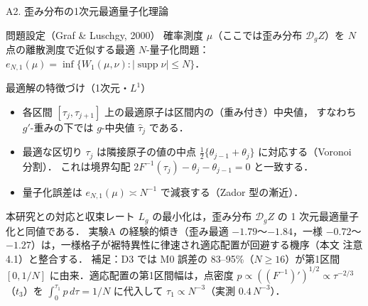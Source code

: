 \documentclass[aspectratio=169, 10pt]{beamer}
\providecommand{\Finv}{}\renewcommand{\Finv}{F^{-1}}
\newcommand{\Lg}{L_g}
\newcommand{\dist}{\mathcal{D}_g}
\begin{document}
\begin{frame}{A2. 歪み分布の1次元最適量子化理論}
  \small
  \begin{block}{問題設定（Graf \& Luschgy, 2000）}
    確率測度 $\mu$（ここでは歪み分布 $\dist Z$）を $N$ 点の離散測度で近似する最適 $N$-量子化問題：
    $e_{N,1}(\mu)=\inf\{W_1(\mu,\nu) : |\operatorname{supp}\nu|\le N\}$．
  \end{block}
  \begin{block}{最適解の特徴づけ（1次元・$L^1$）}
    \begin{itemize}
      \item 各区間 $[\tau_j,\tau_{j+1}]$ 上の最適原子は区間内の\alert{（重み付き）中央値}，
            すなわち $g'$-重みの下では $g$-中央値 $\hat\tau_j$ である．
      \item 最適な区切り $\tau_j$ は隣接原子の値の中点 $\tfrac12\{\theta_{j-1}+\theta_j\}$ に対応する（Voronoi 分割）．
            これは境界勾配 $2\Finv(\tau_j)-\theta_j-\theta_{j-1}=0$ と一致する．
      \item 量子化誤差は $e_{N,1}(\mu)\asymp N^{-1}$ で減衰する（Zador 型の漸近）．
    \end{itemize}
  \end{block}
  \begin{exampleblock}{本研究との対応と収束レート}
    \footnotesize
    $\Lg$ の最小化は，歪み分布 $\dist Z$ の 1 次元最適量子化と同値である．
    実験A の経験的傾き（歪み最適 $-1.79$〜$-1.84$，一様 $-0.72$〜$-1.27$）は，一様格子が裾特異性に律速され適応配置が回避する機序（本文 注意4.1）と整合する．
    補足：D3 では M0 誤差の 83--95\%（$N\ge16$）が第1区間 $[0,1/N]$ に由来．適応配置の第1区間幅は，点密度 $p\propto((\Finv)')^{1/2}\propto\tau^{-2/3}$（$t_3$）を $\int_0^{\tau_1}p\,d\tau=1/N$ に代入して $\tau_1\propto N^{-3}$（実測 $0.4\,N^{-3}$）．
  \end{exampleblock}
\end{frame}
\end{document}
